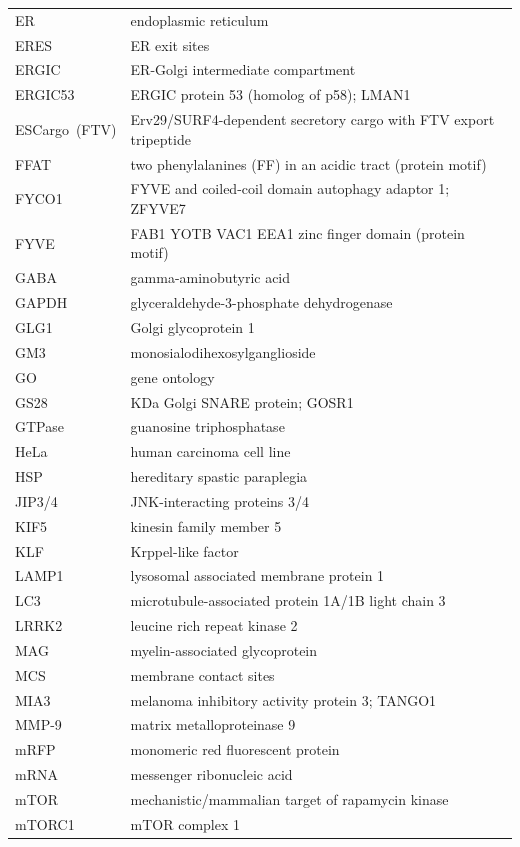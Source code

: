 \documentclass[
  12pt,
  a4paper,
]{book}
\begin{document}
\begin{longtable}[]{@{}
  >{\raggedright\arraybackslash}p{}
  >{\raggedright\arraybackslash}p{}@{}}
ER & endoplasmic reticulum \\
ERES & ER exit sites \\
ERGIC & ER-Golgi intermediate compartment \\
ERGIC53 & ERGIC protein 53 (homolog of p58); LMAN1 \\
ESCargo~(FTV) & Erv29/SURF4-dependent secretory cargo with FTV export tripeptide \\
FFAT & two phenylalanines (FF) in an acidic tract (protein motif) \\
FYCO1 & FYVE and coiled-coil domain autophagy adaptor 1; ZFYVE7 \\
FYVE & FAB1 YOTB VAC1 EEA1 zinc finger domain (protein motif) \\
GABA & gamma-aminobutyric acid \\
GAPDH & glyceraldehyde-3-phosphate dehydrogenase \\
GLG1 & Golgi glycoprotein 1 \\
GM3 & monosialodihexosylganglioside \\
GO & gene ontology \\
GS28 & 28 KDa Golgi SNARE protein; GOSR1 \\
GTPase & guanosine triphosphatase \\
HeLa & human carcinoma cell line \\
HSP & hereditary spastic paraplegia \\
JIP3/4 & JNK-interacting proteins 3/4 \\
KIF5 & kinesin family member 5 \\
KLF & Krppel-like factor \\
LAMP1 & lysosomal associated membrane protein 1 \\
LC3 & microtubule-associated protein 1A/1B light chain 3 \\
LRRK2 & leucine rich repeat kinase 2 \\
MAG & myelin-associated glycoprotein \\
MCS & membrane contact sites \\
MIA3 & melanoma inhibitory activity protein 3; TANGO1 \\
MMP-9 & matrix metalloproteinase 9 \\
mRFP & monomeric red fluorescent protein \\
mRNA & messenger ribonucleic acid \\
mTOR & mechanistic/mammalian target of rapamycin kinase \\
mTORC1 & mTOR complex 1 \\

\end{longtable}
\end{document}

